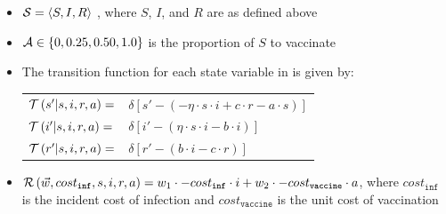 \begin{itemize}
    \item {\footnotesize $ \mathcal{S} = \left\langle S, I, R \right\rangle$ }, where $ S $, $ I $, and $ R $ are as defined above
    \item {\footnotesize $ \mathcal{A} \in \left\lbrace 0, 0.25, 0.50, 1.0 \right\rbrace $} is the proportion of $ S $ to vaccinate
    \item The transition function {\footnotesize \Transition} for each state variable in {\footnotesize \State} is given by:    
    {\footnotesize 
        \abovedisplayskip=5pt
        \belowdisplayskip=0pt
        \renewcommand{\arraystretch}{1.5}
        \begin{tabular}{ll}
            $ \mathcal{T}\left( s' | s, i, r, a \right) =$ & $ \delta \left[ s' - (- \eta \cdot s \cdot i + c \cdot r -a \cdot s) \right] $ \\
            $ \mathcal{T}\left( i' | s, i, r, a \right) =$ & $ \delta \left[ i' - (\eta \cdot s \cdot i - b \cdot i) \right] $ \\
            $ \mathcal{T}\left( r' | s, i, r, a \right) =$ & $ \delta \left[ r' - (b \cdot i - c \cdot r) \right] $ \\            
        \end{tabular}
    }%
    \item {\footnotesize $ \mathcal{R}\left(\vec{w}, cost_{\mathtt{inf}}, s, i, r, a \right) = w_1 \cdot -cost_{\mathtt{inf}} \cdot i + w_2 \cdot -cost_{\mathtt{vaccine}} \cdot a $}, where {\footnotesize $ cost_{\mathtt{inf}} $} is the incident cost of infection and {\footnotesize $ cost_{\mathtt{vaccine}} $} is the unit cost of vaccination \\
\end{itemize} 

